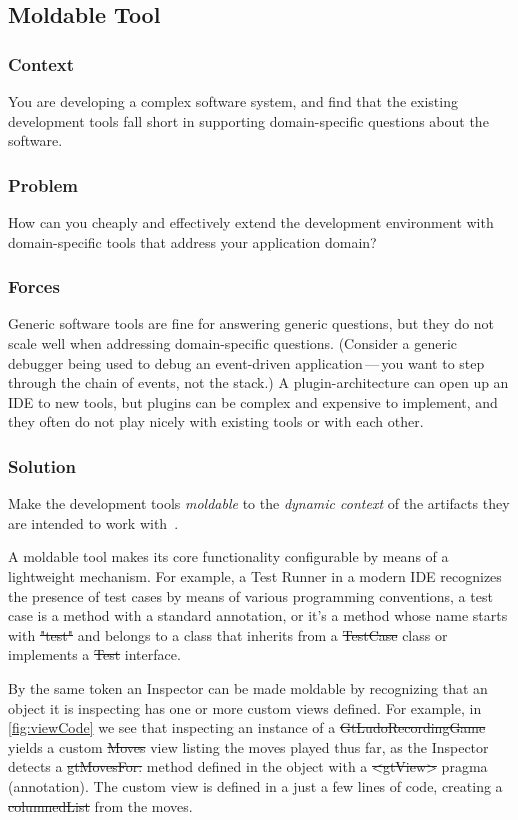 \documentclass[sigconf]{acmart}
\begin{document}
\subsection*{Moldable Tool}\label{pat:moldableTool}

\subsubsection*{Context}
You are developing a complex software system, and find that the existing development tools fall short in supporting domain-specific questions about the software.

\subsubsection*{Problem}
How can you cheaply and effectively extend the development environment with domain-specific tools that address your application domain?

\subsubsection*{Forces}
Generic software tools are fine for answering generic questions, but they do not scale well when addressing domain-specific questions.
(Consider a generic debugger being used to debug an event-driven application\,---\,you want to step through the chain of events, not the stack.)
A plugin-architecture can open up an IDE to new tools, but plugins can be complex and expensive to implement, and they often do not play nicely with existing tools or with each other.

\subsubsection*{Solution}
Make the development tools \emph{moldable} to the \emph{dynamic context} of the artifacts they are intended to work with~\cite{Chis17a}.

A moldable tool makes its core functionality configurable by means of a lightweight mechanism.
For example, a Test Runner in a modern IDE recognizes the presence of test cases by means of various programming conventions, \ie a test case is a method with a standard annotation, or it's a method whose name starts with \st{"test"} and belongs to a class that inherits from a \st{TestCase} class or implements a \st{Test} interface.

By the same token an Inspector can be made moldable by recognizing that an object it is inspecting has one or more custom views defined.
For example, in \autoref{fig:viewCode} we see that inspecting an instance of a \st{GtLudoRecordingGame} yields a custom \st{Moves} view listing the moves played thus far, as the Inspector detects a \st{gtMovesFor:} method defined in the object with a \st{<gtView>} pragma (\ie annotation).
The custom view is defined in a just a few lines of code, creating a \st{columnedList} from the moves.
\end{document}
